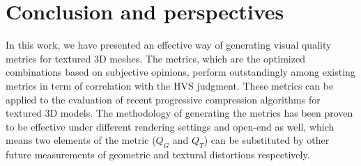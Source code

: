 \section{Conclusion and perspectives}
In this work, we have presented an effective way of generating visual quality metrics for textured 3D meshes. The metrics, which are the optimized combinations based on subjective opinions, perform outstandingly among existing metrics in term of correlation with the HVS judgment.  These metrics can be applied to the evaluation of recent progressive compression algorithms for textured 3D models. The methodology of generating the metrics has been proven to be effective under different rendering settings and open-end as well, which means two elements of the metric ($Q_G$ and $Q_T$) can be substituted by other future measurements of geometric and textural distortions respectively.  \\
